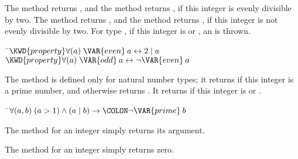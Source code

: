 
The method  returns , and the method  returns ,
if this integer is evenly divisible by two.
The method  returns , and the method  returns ,
if this integer is not evenly divisible by two.
For type , if this integer is \EXP{+\infty} or \EXP{-\infty},
an  is thrown.


\begin{Fortress}
{\tt~}\pushtabs\=\+\( \KWD{property} \forall (a)\; \VAR{even}\:a \leftrightarrow 2 \mid a\)\\
\( \KWD{property} \forall (a)\; \VAR{odd}\:a \leftrightarrow \neg \VAR{even}\:a\)\-\\\poptabs
\end{Fortress}




The method  is defined only for natural number types;
it returns  if this integer is a prime number, and
otherwise returns .  It returns  if this
integer is  or .

\begin{Fortress}
{\tt~}\pushtabs\=\+\( \forall (a, b)\; (a > 1) \wedge (a \mid b) \rightarrow\COLON \neg \VAR{prime}\:b\)\-\\\poptabs
\end{Fortress}



The method  for an integer simply returns its argument.



The method  for an integer simply returns zero.

